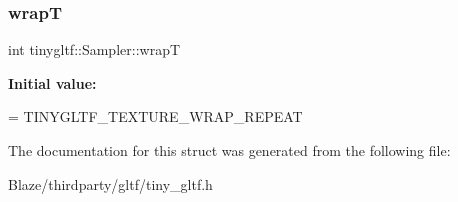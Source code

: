 \subsubsection{\texorpdfstring{wrapT}{wrapT}}
{\footnotesize\ttfamily int tinygltf\+::\+Sampler\+::wrapT}

{\bfseries Initial value\+:}
\begin{DoxyCode}
=
            TINYGLTF\_TEXTURE\_WRAP\_REPEAT
\end{DoxyCode}


The documentation for this struct was generated from the following file\+:\begin{DoxyCompactItemize}
\item 
Blaze/thirdparty/gltf/tiny\+\_\+gltf.\+h\end{DoxyCompactItemize}
